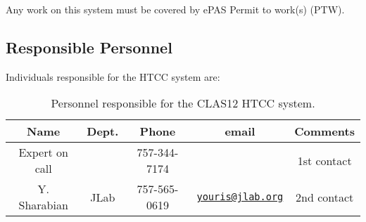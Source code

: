 Any work on this system must be covered by ePAS Permit to work(s) (PTW).

\subsection{Responsible Personnel}

Individuals responsible for the HTCC system are:

\begin{table}[!htb]
\centering
\begin{tabular}{|c|c|c|c|c|} \hline
Name          & Dept.& Phone        & email &Comments \\ \hline
Expert on call&      & 757-344-7174 &       & 1st contact \\ \hline
Y. Sharabian  & JLab & 757-565-0619 &\href{mailto:youris@jlab.org}{\nolinkurl{youris@jlab.org}}&2nd contact \\ \hline
\end{tabular}
\caption{Personnel responsible for the CLAS12 HTCC system.} 
\label{tb:htcc}
\end{table}

